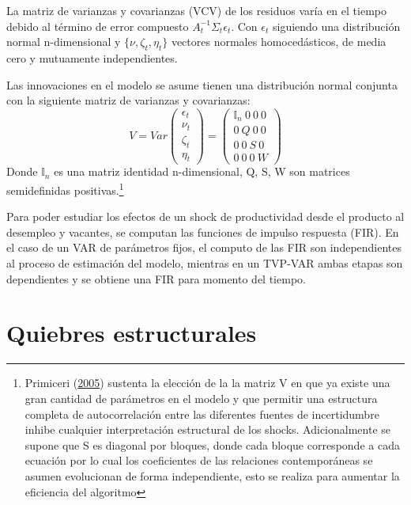\documentclass[12pt,oneside]{reedthesis}
\begin{document}
La matriz de varianzas y covarianzas (VCV) de los residuos varía en el tiempo debido al término de error compuesto \(A_t^{-1}\Sigma_t\epsilon_t\). Con \(\epsilon_t\) siguiendo una distribución normal n-dimensional y \(\{\nu, \zeta_t, \eta_t\}\) vectores normales homocedásticos, de media cero y mutuamente independientes.

Las innovaciones en el modelo se asume tienen una distribución normal conjunta con la siguiente matriz de varianzas y covarianzas:
\begin{equation}
V = Var 
\begin{pmatrix} 
\epsilon_t \\\nu_t \\ \zeta_t \\ \eta_t 
\end{pmatrix} =
\begin{pmatrix}
\mathbb{I}_n \ 0 \ 0 \ 0\\
0 \ Q \ 0 \ 0 \\
0 \ 0 \ S \ 0 \\
0\ 0\ 0\ W
\end{pmatrix}
\end{equation}
Donde \(\mathbb{I}_n\) es una matriz identidad n-dimensional, Q, S, W son matrices semidefinidas positivas.\footnote{Primiceri (\protect\hyperlink{ref-Primiceri2005}{2005}) sustenta la elección de la la matriz V en que ya existe una gran cantidad de parámetros en el modelo y que permitir una estructura completa de autocorrelación entre las diferentes fuentes de incertidumbre inhibe cualquier interpretación estructural de los shocks. Adicionalmente se supone que S es diagonal por bloques, donde cada bloque corresponde a cada ecuación por lo cual los coeficientes de las relaciones contemporáneas se asumen evolucionan de forma independiente, esto se realiza para aumentar la eficiencia del algoritmo}

Para poder estudiar los efectos de un shock de productividad desde el producto al desempleo y vacantes, se computan las funciones de impulso respuesta (FIR). En el caso de un VAR de parámetros fijos, el computo de las FIR son independientes al proceso de estimación del modelo, mientras en un TVP-VAR ambas etapas son dependientes y se obtiene una FIR para momento del tiempo.

\hypertarget{quiebres-estructurales}{%
\section{Quiebres estructurales}\label{quiebres-estructurales}}
\end{document}
